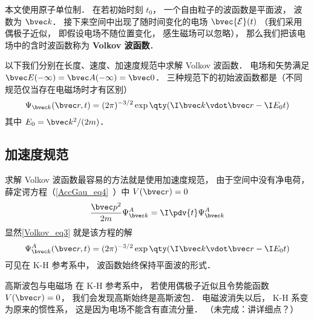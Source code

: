 
\begin{issues}
\issueTODO
\end{issues}


本文使用原子单位制． 在若初始时刻 $t_0$， 一个自由粒子的波函数是平面波， 波数为 $\bvec k$． 接下来空间中出现了随时间变化的电场 $\bvec {\mathcal E}(t)$ （我们采用偶极子近似， 即假设电场不随位置变化， 感生磁场可以忽略）， 那么我们把该电场中的含时波函数称为 \textbf{Volkov 波函数}．

以下我们分别在长度、速度、加速度规范中求解 Volkov 波函数． 电场和矢势满足 $\bvec E(-\infty) = \bvec A(-\infty) = \bvec 0$． 三种规范下的初始波函数都是（不同规范仅当存在电磁场时才有区别）
\begin{equation}\label{Volkov_eq3}
\Psi_{\bvec k}(\bvec r, t) = (2\pi)^{-3/2} \exp\qty(\I\bvec k \vdot \bvec r - \I E_0 t)
\end{equation}
其中 $E_0 = \bvec k^2/(2m)$．

\subsection{加速度规范}
求解 Volkov 波函数最容易的方法就是使用加速度规范， 由于空间中没有净电荷， 薛定谔方程（\autoref{AccGau_eq4}~）中 $V(\bvec r) = 0$
\begin{equation}
\frac{\bvec p^2}{2m}\Psi_{\bvec k}^A = \I \pdv{t} \Psi_{\bvec k}^A
\end{equation}
显然\autoref{Volkov_eq3} 就是该方程的解
\begin{equation}\label{Volkov_eq2}
\Psi_{\bvec k}^A(\bvec r, t) = (2\pi)^{-3/2} \exp\qty(\I\bvec k \vdot \bvec r - \I E_0 t)
\end{equation}
可见在 K-H 参考系中， 波函数始终保持平面波的形式．

\begin{example}{高斯波包与电磁场}
在 K-H 参考系中， 若使用偶极子近似且令势能函数 $V(\bvec r) = 0$， 我们会发现高斯始终是高斯波包． 电磁波消失以后， K-H 系变为原来的惯性系， 这是因为电场不能含有直流分量． （未完成：讲详细点？）
\end{example}

